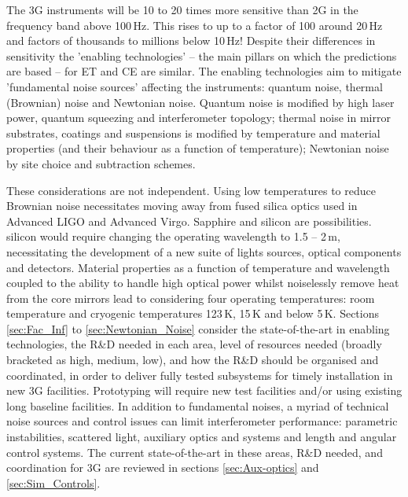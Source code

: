 The 3G instruments will be 10 to 20 times more sensitive than 2G in the frequency band above  100\,Hz.  This rises to up to a factor of 100 around 20\,Hz and factors of thousands to millions below 10\,Hz!  Despite their differences in sensitivity the 'enabling technologies' -- the main pillars on which the predictions are based -- for ET and CE are similar. The enabling technologies aim to mitigate 'fundamental noise sources' affecting the instruments:  quantum noise, thermal (Brownian) noise and Newtonian noise. 
Quantum noise is modified by high laser power, quantum squeezing and interferometer topology; thermal noise in mirror substrates, coatings and suspensions is modified by temperature and material properties (and their behaviour as a function of temperature); Newtonian noise by site choice and subtraction schemes.  

These considerations are not independent. Using low temperatures to reduce Brownian noise necessitates moving away from fused silica optics used in Advanced LIGO and Advanced Virgo. Sapphire and silicon are possibilities.  silicon would require changing the operating wavelength to 1.5 -- 2\,\micro m, necessitating the development of a new suite of lights sources, optical components and detectors.  Material properties as a function of temperature and wavelength coupled to the ability to handle high optical power whilst noiselessly remove heat from the core mirrors lead to considering four operating temperatures:  room temperature and cryogenic temperatures 123\,K, 15\,K and below 5\,K.  Sections \ref{sec:Fac_Inf} to \ref{sec:Newtonian_Noise} consider the state-of-the-art in enabling technologies, the R\&D needed in each area, level of resources needed (broadly bracketed as high, medium, low), and how the R\&D should be organised and coordinated, in order to deliver fully tested subsystems for  timely installation in new 3G facilities. Prototyping will require new test facilities and/or using existing long baseline facilities.
In addition to fundamental noises, a myriad of technical noise sources and control issues can limit interferometer performance:  parametric instabilities, scattered light, auxiliary optics and systems and length and angular control systems.  The current state-of-the-art in these areas, R\&D needed, and coordination for 3G are reviewed in sections \ref{sec:Aux-optics} and \ref{sec:Sim_Controls}. 

